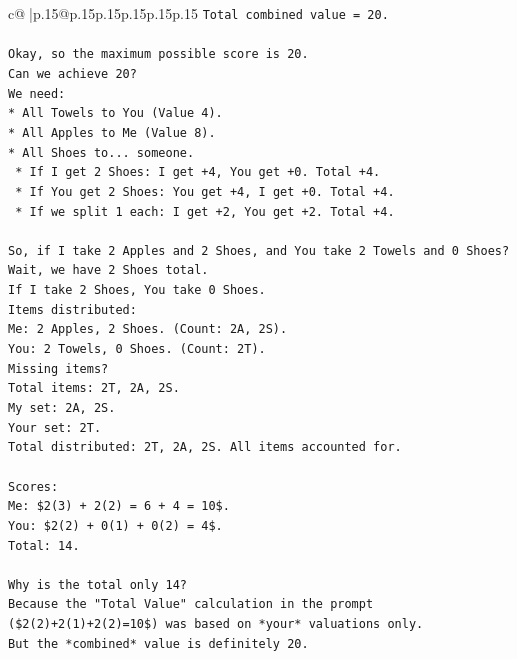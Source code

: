 \documentclass{article}
\begin{document}
{\begin{supertabular}{c@{$\;$}|p{.15\linewidth}@{}p{.15\linewidth}p{.15\linewidth}p{.15\linewidth}p{.15\linewidth}p{.15\linewidth}}
{{{\texttt{Total combined value = 20.} \\
\\ 
\texttt{Okay, so the maximum possible score is 20.} \\
\texttt{Can we achieve 20?} \\
\texttt{We need:} \\
\texttt{*   All Towels to You (Value 4).} \\
\texttt{*   All Apples to Me (Value 8).} \\
\texttt{*   All Shoes to... someone.} \\
\texttt{    *   If I get 2 Shoes: I get +4, You get +0. Total +4.} \\
\texttt{    *   If You get 2 Shoes: You get +4, I get +0. Total +4.} \\
\texttt{    *   If we split 1 each: I get +2, You get +2. Total +4.} \\
\\ 
\texttt{So, if I take 2 Apples and 2 Shoes, and You take 2 Towels and 0 Shoes?} \\
\texttt{Wait, we have 2 Shoes total.} \\
\texttt{If I take 2 Shoes, You take 0 Shoes.} \\
\texttt{Items distributed:} \\
\texttt{Me: 2 Apples, 2 Shoes. (Count: 2A, 2S).} \\
\texttt{You: 2 Towels, 0 Shoes. (Count: 2T).} \\
\texttt{Missing items?} \\
\texttt{Total items: 2T, 2A, 2S.} \\
\texttt{My set: 2A, 2S.} \\
\texttt{Your set: 2T.} \\
\texttt{Total distributed: 2T, 2A, 2S. All items accounted for.} \\
\\ 
\texttt{Scores:} \\
\texttt{Me: \$2(3) + 2(2) = 6 + 4 = 10\$.} \\
\texttt{You: \$2(2) + 0(1) + 0(2) = 4\$.} \\
\texttt{Total: 14.} \\
\\ 
\texttt{Why is the total only 14?} \\
\texttt{Because the "Total Value" calculation in the prompt (\$2(2)+2(1)+2(2)=10\$) was based on *your* valuations only.} \\
\texttt{But the *combined* value is definitely 20.} \\
}}}
\end{supertabular}}
\end{document}
